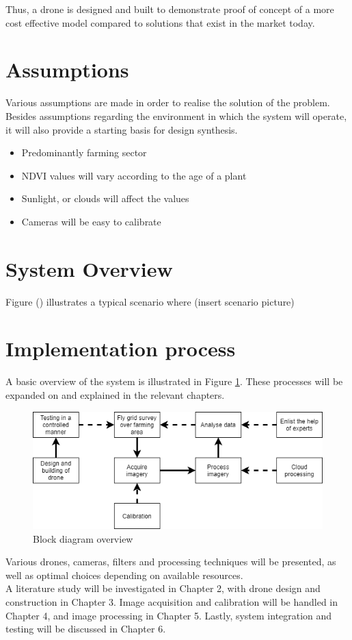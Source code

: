 Thus, a drone is designed and built to demonstrate proof of concept of a more cost effective model compared to solutions that exist in the market today.\\

\section{Assumptions}

Various assumptions are made in order to realise the solution of the problem. Besides assumptions regarding the environment in which the system will operate, it will also provide a starting basis for design synthesis.

\begin{itemize}
    \item Predominantly farming sector
    \item NDVI values will vary according to the age of a plant
    \item Sunlight, or clouds will affect the values
    \item Cameras will be easy to calibrate
\end{itemize}

\section{System Overview}

Figure () illustrates a typical scenario where 
(insert scenario picture)

\section{Implementation process}

A basic overview of the system is illustrated in Figure \ref{fig:overview}. These processes will be expanded on and explained in the relevant chapters.

\begin{figure}[H]
\centering
\includegraphics[scale=0.6]{images/thesis_overview.png}
\caption{Block diagram overview}
\label{fig:overview}
\end{figure}

Various drones, cameras, filters and processing techniques will be presented, as well as optimal choices depending on available resources.\\

A literature study will be investigated in Chapter 2, with drone design and construction in Chapter 3. Image acquisition and calibration will be handled in Chapter 4, and image processing in Chapter 5. Lastly, system integration and testing will be discussed in Chapter 6.